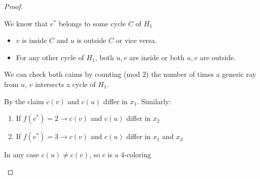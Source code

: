 \documentclass[a4paper]{article}
\theoremstyle{plain}
\theoremstyle{myremark}
\begin{document}
\begin{proof}
\begin{itemize}
\begin{center}
\begin{tikzpicture}
\end{tikzpicture}
\end{center}
We know that $e^*$ belongs to some cycle $C$ of $H_1$
    \begin{itemize}
        \item $v$ is inside $C$ and $u$ is outside $C$ or vice versa.
        \item For any other cycle of $H_1$, both $u,v$ are inside or both $u,v$ are outside.
    \end{itemize}
    We can check both caims by counting (mod $2$) the number of times a generic ray from $u$, $v$ intersects a cycle of $H_1$.
    
    By the claim $c(v)$ and $c(u)$ differ in $x_1$. Similarly:
    \begin{enumerate}
        \item[]If $f(e^*)= 2 \rightarrow c(v)$ and $c(u)$ differ in $x_2$
        \item[]If $f(e^*)= 3 \rightarrow c(v)$ and $c(u)$ differ in $x_1$ and $x_2$
    \end{enumerate}
    In any case $c(u)\neq c(v)$, so $c$ is a 4-coloring
\end{itemize}
\end{proof}
\end{document}
